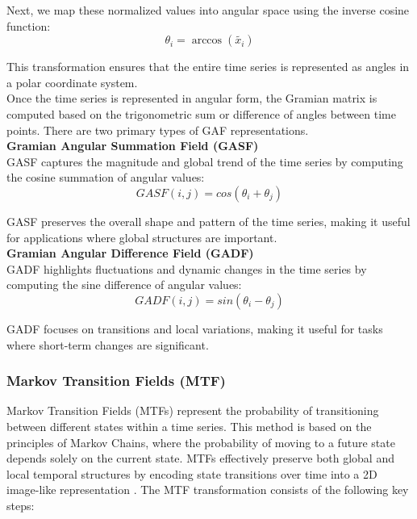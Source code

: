 Next, we map these normalized values into angular space using the inverse cosine function:
\begin{equation}
    \theta_{i} = \arccos(\tilde{x_{i}})
\end{equation}

This transformation ensures that the entire time series is represented as angles in a polar coordinate system. \\

Once the time series is represented in angular form, the Gramian matrix is computed based on the trigonometric sum or difference of angles between time points. There are two primary types of GAF representations. \\

\textbf{Gramian Angular Summation Field (GASF)} \\

GASF captures the magnitude and global trend of the time series by computing the cosine summation of angular values:
\begin{equation}
    GASF(i,j) = cos( \theta_{i} + \theta_{j})
\end{equation}

GASF preserves the overall shape and pattern of the time series, making it useful for applications where global structures are important. \\

\textbf{Gramian Angular Difference Field (GADF)} \\

GADF highlights fluctuations and dynamic changes in the time series by computing the sine difference of angular values:
\begin{equation}
    GADF(i,j) = sin( \theta_{i} - \theta_{j})
\end{equation}

GADF focuses on transitions and local variations, making it useful for tasks where short-term changes are significant.

\subsubsection*{Markov Transition Fields (MTF)}

Markov Transition Fields (MTFs) represent the probability of transitioning between different states within a time series. This method is based on the principles of Markov Chains, where the probability of moving to a future state depends solely on the current state. MTFs effectively preserve both global and local temporal structures by encoding state transitions over time into a 2D image-like representation \parencite{wang2015imaging}. The MTF transformation consists of the following key steps: 


